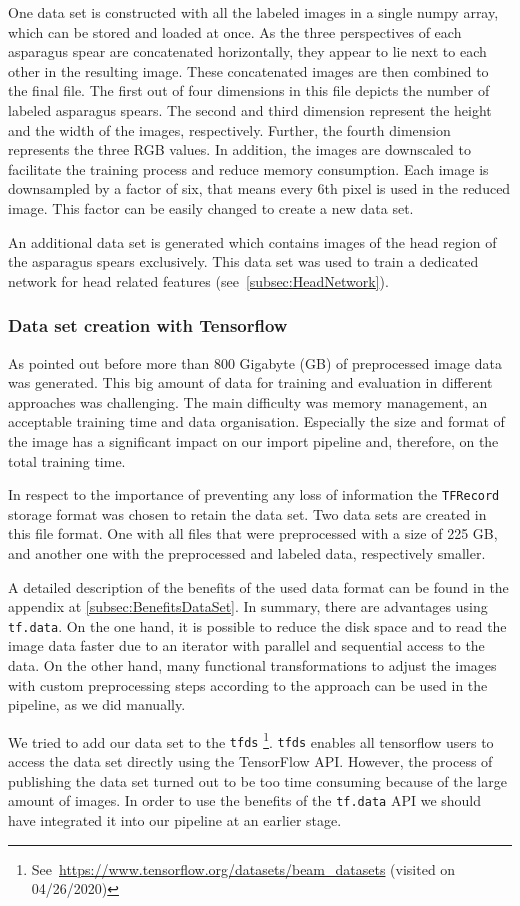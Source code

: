 One data set is constructed with all the labeled images in a single numpy array, which can be stored and loaded at once. As the three perspectives of each asparagus spear are concatenated horizontally, they appear to lie next to each other in the resulting image. These concatenated images are then combined to the final file. The first out of four dimensions in this file depicts the number of labeled asparagus spears. The second and third dimension represent the height and the width of the images, respectively. Further, the fourth dimension represents the three RGB values.
In addition, the images are downscaled to facilitate the training process and reduce memory consumption. Each image is downsampled by a factor of six, that means every 6th pixel is used in the reduced image. This factor can be easily changed to create a new data set.

An additional data set is generated which contains images of the head region of the asparagus spears exclusively. This data set was used to train a dedicated network for head related features (see~\autoref{subsec:HeadNetwork}).


\subsubsection{Data set creation with Tensorflow}
\label{subsec:DataSetTheory}

As pointed out before more than 800 Gigabyte (GB) of preprocessed image data was generated. This big amount of data for training and evaluation in different approaches was challenging. The main difficulty was memory management, an acceptable training time and data organisation. Especially the size and format of the image has a significant impact on our import pipeline and, therefore, on the total training time. 

In respect to the importance of preventing any loss of information the \texttt{TFRecord} storage format was chosen to retain the data set. Two data sets are created in this file format. One with all files that were preprocessed with a size of 225 GB, and another one with the preprocessed and labeled data, respectively smaller. 

A detailed description of the benefits of the used data format can be found in the appendix at \autoref{subsec:BenefitsDataSet}. In summary, there are advantages using \texttt{tf.data}. On the one hand, it is possible to reduce the disk space and to read the image data faster due to an iterator with parallel and sequential access to the data. On the other hand, many functional transformations to adjust the images with custom preprocessing steps according to the approach can be used in the pipeline, as we did manually.

\bigskip
We tried to add our data set to the \texttt{\acrshort{tfds}} \footnote{See~\url{https://www.tensorflow.org/datasets/beam\_datasets} (visited on 04/26/2020)}. \texttt{\acrshort{tfds}} enables all tensorflow users to access the data set directly using the TensorFlow API. However, the process of publishing the data set turned out to be too time consuming because of the large amount of images. In order to use the benefits of the \mbox{\texttt{tf.data}} API we should have integrated it into our pipeline at an earlier stage.